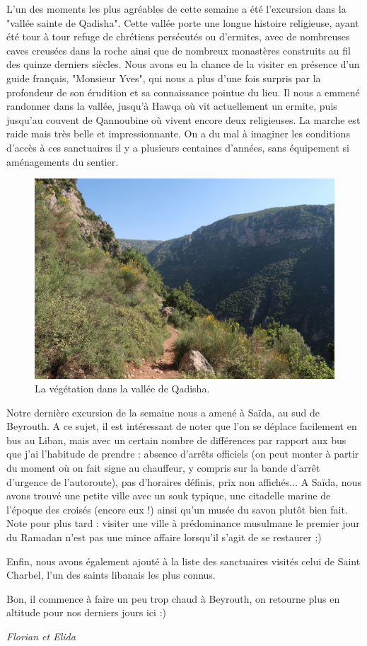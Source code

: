 L'un des moments les plus agréables de cette semaine a été l'excursion
dans la "vallée sainte de Qadisha". Cette vallée porte une longue
histoire religieuse, ayant été tour à tour refuge de chrétiens
persécutés ou d'ermites, avec de nombreuses caves creusées dans la roche
ainsi que de nombreux monastères construits au fil des quinze derniers
siècles. Nous avons eu la chance de la visiter en présence d'un guide
français, "Monsieur Yves", qui nous a plus d'une fois surpris par la
profondeur de son érudition et sa connaissance pointue du lieu. Il nous
a emmené randonner dans la vallée, jusqu'à Hawqa où vit actuellement un
ermite, puis jusqu'au couvent de Qannoubine où vivent encore deux
religieuses. La marche est raide mais très belle et impressionnante. On
a du mal à imaginer les conditions d'accès à ces sanctuaires il y a
plusieurs centaines d'années, sans équipement si aménagements du
sentier.

\begin{figure}
\centering
\includegraphics{images/20180521_qadisha.JPG}
\caption{La végétation dans la vallée de Qadisha.}
\end{figure}

Notre dernière excursion de la semaine nous a amené à Saïda, au sud de
Beyrouth. A ce sujet, il est intéressant de noter que l'on se déplace
facilement en bus au Liban, mais avec un certain nombre de différences
par rapport aux bus que j'ai l'habitude de prendre : absence d'arrêts
officiels (on peut monter à partir du moment où on fait signe au
chauffeur, y compris sur la bande d'arrêt d'urgence de l'autoroute), pas
d'horaires définis, prix non affichés... A Saïda, nous avons trouvé une
petite ville avec un souk typique, une citadelle marine de l'époque des
croisés (encore eux !) ainsi qu'un musée du savon plutôt bien fait. Note
pour plus tard : visiter une ville à prédominance musulmane le premier
jour du Ramadan n'est pas une mince affaire lorsqu'il s'agit de se
restaurer ;)

Enfin, nous avons également ajouté à la liste des sanctuaires visités
celui de Saint Charbel, l'un des saints libanais les plus connus.

Bon, il commence à faire un peu trop chaud à Beyrouth, on retourne plus
en altitude pour nos derniers jours ici :)

\emph{Florian et Elida}
